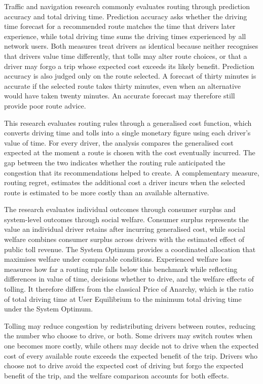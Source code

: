 \documentclass{article}
\begin{document}
Traffic and navigation research commonly evaluates routing through prediction accuracy and total driving time. Prediction accuracy asks whether the driving time forecast for a recommended route matches the time that drivers later experience, while total driving time sums the driving times experienced by all network users. Both measures treat drivers as identical because neither recognises that drivers value time differently, that tolls may alter route choices, or that a driver may forgo a trip whose expected cost exceeds its likely benefit. Prediction accuracy is also judged only on the route selected. A forecast of thirty minutes is accurate if the selected route takes thirty minutes, even when an alternative would have taken twenty minutes. An accurate forecast may therefore still provide poor route advice.

This research evaluates routing rules through a generalised cost function, which converts driving time and tolls into a single monetary figure using each driver's value of time. For every driver, the analysis compares the generalised cost expected at the moment a route is chosen with the cost eventually incurred. The gap between the two indicates whether the routing rule anticipated the congestion that its recommendations helped to create. A complementary measure, routing regret, estimates the additional cost a driver incurs when the selected route is estimated to be more costly than an available alternative.

The research evaluates individual outcomes through consumer surplus and system-level outcomes through social welfare. Consumer surplus represents the value an individual driver retains after incurring generalised cost, while social welfare combines consumer surplus across drivers with the estimated effect of public toll revenue. The System Optimum provides a coordinated allocation that maximises welfare under comparable conditions. Experienced welfare loss measures how far a routing rule falls below this benchmark while reflecting differences in value of time, decisions whether to drive, and the welfare effects of tolling. It therefore differs from the classical Price of Anarchy, which is the ratio of total driving time at User Equilibrium to the minimum total driving time under the System Optimum.

Tolling may reduce congestion by redistributing drivers between routes, reducing the number who choose to drive, or both. Some drivers may switch routes when one becomes more costly, while others may decide not to drive when the expected cost of every available route exceeds the expected benefit of the trip. Drivers who choose not to drive avoid the expected cost of driving but forgo the expected benefit of the trip, and the welfare comparison accounts for both effects.
\end{document}
